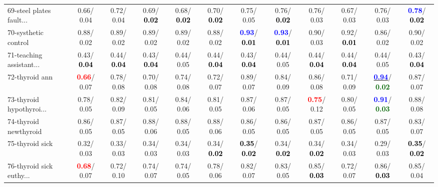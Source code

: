 \begin{table}[h]
\begin{center}
{\begin{tabular}{lc|c|c|c|c|c|c|c|c|c|c}
69-steel plates fault... &   0.66/  0.04 &   0.72/  0.04 &   0.69/\textcolor{black}{\textbf{  0.02}} &   0.68/\textcolor{black}{\textbf{  0.02}} &   0.70/\textcolor{black}{\textbf{  0.02}} &   0.75/  0.05 &   0.76/\textcolor{black}{\textbf{  0.02}} &   0.76/  0.03 &   0.67/  0.03 &   0.76/  0.03 & \textcolor{blue}{\textbf{  0.78}}/\textcolor{black}{\textbf{  0.02}} \\
70-systhetic control &   0.88/  0.02 &   0.89/  0.02 &   0.89/  0.02 &   0.89/  0.02 &   0.88/  0.02 & \textcolor{blue}{\textbf{  0.93}}/\textcolor{black}{\textbf{  0.01}} & \textcolor{blue}{\textbf{  0.93}}/\textcolor{black}{\textbf{  0.01}} &   0.90/  0.03 &   0.92/\textcolor{black}{\textbf{  0.01}} &   0.86/  0.02 &   0.90/  0.02 \\
71-teaching assistant... &   0.43/\textcolor{black}{\textbf{  0.04}} &   0.44/\textcolor{black}{\textbf{  0.04}} &   0.43/\textcolor{black}{\textbf{  0.04}} &   0.44/  0.05 &   0.44/\textcolor{black}{\textbf{  0.04}} &   0.43/\textcolor{black}{\textbf{  0.04}} &   0.44/  0.05 &   0.44/\textcolor{black}{\textbf{  0.04}} &   0.44/\textcolor{black}{\textbf{  0.04}} &   0.44/  0.05 &   0.43/\textcolor{black}{\textbf{  0.04}} \\ \hline
72-thyroid ann & \textcolor{red}{\textbf{  0.66}}/  0.07 &   0.78/  0.08 &   0.70/  0.08 &   0.74/  0.08 &   0.72/  0.07 &   0.89/  0.07 &   0.84/  0.09 &   0.86/  0.08 &   0.71/  0.09 & \underline{\textcolor{blue}{\textbf{  0.94}}}/\textcolor{darkgreen}{\textbf{  0.02}} &   0.87/  0.07 \\
73-thyroid hypothyroi... &   0.78/  0.05 &   0.82/  0.09 &   0.81/  0.05 &   0.84/  0.06 &   0.81/  0.05 &   0.87/  0.06 &   0.87/  0.05 & \textcolor{red}{\textbf{  0.75}}/  0.12 &   0.80/  0.05 & \textcolor{blue}{\textbf{  0.91}}/\textcolor{darkgreen}{\textbf{  0.03}} &   0.88/  0.08 \\
74-thyroid newthyroid &   0.86/  0.05 &   0.87/  0.05 &   0.88/  0.06 &   0.88/  0.05 &   0.88/  0.06 &   0.86/  0.05 &   0.86/  0.05 &   0.87/  0.05 &   0.86/  0.05 &   0.87/  0.05 &   0.83/  0.07 \\
75-thyroid sick &   0.32/  0.03 &   0.33/  0.03 &   0.34/  0.03 &   0.34/  0.03 &   0.34/\textcolor{black}{\textbf{  0.02}} & \textcolor{black}{\textbf{  0.35}}/\textcolor{black}{\textbf{  0.02}} &   0.34/\textcolor{black}{\textbf{  0.02}} &   0.34/\textcolor{black}{\textbf{  0.02}} &   0.34/  0.03 &   0.29/  0.03 & \textcolor{black}{\textbf{  0.35}}/\textcolor{black}{\textbf{  0.02}} \\
76-thyroid sick euthy... & \textcolor{red}{\textbf{  0.68}}/  0.07 &   0.72/  0.10 &   0.74/  0.07 &   0.74/  0.05 &   0.78/  0.06 &   0.82/  0.07 &   0.83/  0.05 &   0.85/\textcolor{black}{\textbf{  0.03}} &   0.72/  0.07 &   0.86/\textcolor{black}{\textbf{  0.03}} &   0.85/  0.04 \\

\end{tabular}}
\end{center}
\end{table}
